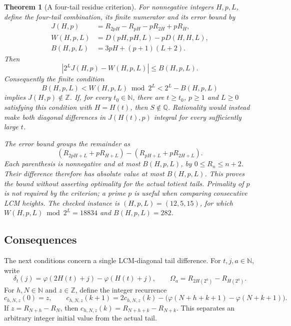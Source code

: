 \documentclass[11pt]{article}
\theoremstyle{plain}
\newtheorem{thm}{Theorem}[section]
\theoremstyle{definition}
\theoremstyle{remark}
\begin{document}
\begin{thm}[A four-tail residue criterion]\label{catalogue:mob:e2}
For nonnegative integers $H,p,L$, define the four-tail combination,
its finite numerator and its error bound by
\[
\begin{aligned}
 J(H,p)&=R_{2pH}-R_{pH}-pR_{2H}+pR_H,\\
 W(H,p,L)&=D(pH,pH,L)-pD(H,H,L),\\
 B(H,p,L)&=3pH+(p+1)(L+2).
\end{aligned}
\]
Then
\[
 |2^LJ(H,p)-W(H,p,L)|\le B(H,p,L).
\]
Consequently the finite condition
\[
 B(H,p,L)<W(H,p,L)\bmod2^L<2^L-B(H,p,L)
\]
implies $J(H,p)\notin\mathbb Z$. If, for every $t_0\in\mathbb N$,
there are $t\ge t_0$, $p\ge1$ and $L\ge0$ satisfying this condition
with $H=H(t)$, then $S\notin\mathbb Q$. Rationality would instead make
both diagonal differences in $J(H(t),p)$ integral for every sufficiently
large $t$.

The error bound groups the remainder as
\[
 (R_{2pH+L}+pR_{H+L})-(R_{pH+L}+pR_{2H+L}).
\]
Each parenthesis is nonnegative and at most $B(H,p,L)$, by
$0\le R_n\le n+2$. Their difference therefore has absolute value at
most $B(H,p,L)$. This proves the bound without asserting optimality for
the actual totient tails. Primality of $p$ is not required by the
criterion; a prime $p$ is useful when comparing consecutive LCM heights.
The checked instance is $(H,p,L)=(12,5,15)$, for which
$W(H,p,L)\bmod2^L=18834$ and $B(H,p,L)=282$.
\end{thm}
\subsection{Consequences}

The next conditions concern a single LCM-diagonal tail difference. For
$t,j,a\in\mathbb N$, write
\[
 \delta_t(j)=\varphi(2H(t)+j)-\varphi(H(t)+j),
 \qquad \Omega_a=R_{2H(2^a)}-R_{H(2^a)}.
\]
For $h,N\in\mathbb N$ and $z\in\mathbb Z$, define the integer recurrence
\[
 c_{h,N,z}(0)=z,\qquad
 c_{h,N,z}(k+1)=2c_{h,N,z}(k)
   -\bigl(\varphi(N+h+k+1)-\varphi(N+k+1)\bigr).
\]
If $z=R_{N+h}-R_N$, then $c_{h,N,z}(k)=R_{N+h+k}-R_{N+k}$.
This separates an arbitrary integer initial value from the actual tail.
\end{document}
